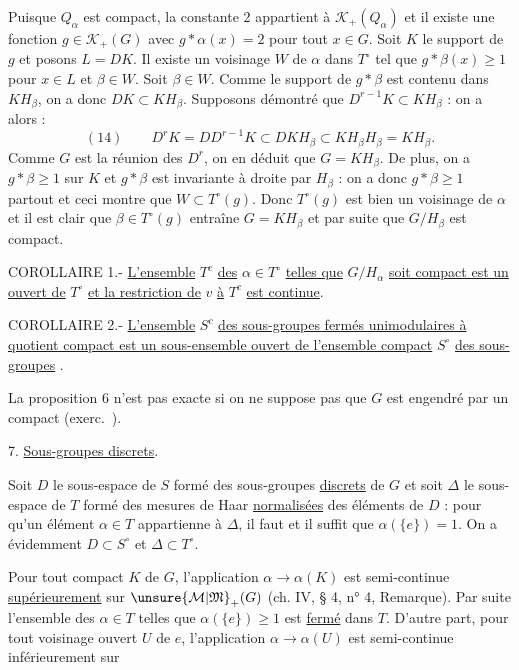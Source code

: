 Puisque $Q_\alpha$ est compact, la constante 2 appartient à $\mathcal K_+(Q_\alpha)$ et il existe une fonction $g\in\mathcal K_+(G)$ avec $g*\alpha(x)=2$ pour tout $x\in G$. Soit $K$ le support de $g$ et posons $L=DK$. Il existe un voisinage $W$ de $\alpha$ dans $T^\circ$ tel que $g*\beta(x)\geq 1$ pour $x\in L$ et $\beta\in W$. Soit $\beta\in W$. Comme le support de $g*\beta$ est contenu dans $KH_\beta$, on a donc $DK\subset KH_\beta$. Supposons démontré que $D^{r-1}K\subset KH_\beta$ : on a alors :
\[
(14)\qquad D^rK=DD^{r-1}K\subset DKH_\beta\subset KH_\beta H_\beta=KH_\beta.
\]
Comme $G$ est la réunion des $D^r$, on en déduit que $G=KH_\beta$. De plus, on a $g*\beta\geq 1$ sur $K$ et $g*\beta$ est invariante à droite par $H_\beta$ : on a donc $g*\beta\geq 1$ partout et ceci montre que $W\subset T^\circ(g)$. Donc $T^\circ(g)$ est bien un voisinage de $\alpha$ et il est clair que $\beta\in T^\circ(g)$ entraîne $G=KH_\beta$ et par suite que $G/H_\beta$ est compact.

COROLLAIRE 1.- \uline{L'ensemble} $T^c$ \uline{des} $\alpha\in T^\circ$ \uline{telles que} $G/H_\alpha$ \uline{soit compact est un ouvert de} $T^\circ$ \uline{et la restriction de} $v$ \uline{à} $T^c$ \uline{est continue}.

COROLLAIRE 2.- \uline{L'ensemble} $S^c$ \uline{des sous-groupes fermés unimodulaires à quotient compact est un sous-ensemble ouvert de l'ensemble compact} $S^\circ$ \uline{des sous-groupes} .

La proposition 6 n'est pas exacte si on ne suppose pas que $G$ est engendré par un compact (exerc.\ ).

7. \uline{Sous-groupes discrets}.

Soit $D$ le sous-espace de $S$ formé des sous-groupes \uline{discrets} de $G$ et soit $\Delta$ le sous-espace de $T$ formé des mesures de Haar \uline{normalisées} des éléments de $D$ : pour qu'un élément $\alpha\in T$ appartienne à $\Delta$, il faut et il suffit que $\alpha(\{e\})=1$. On a évidemment $D\subset S^\circ$ et $\Delta\subset T^\circ$.

Pour tout compact $K$ de $G$, l'application $\alpha\longrightarrow\alpha(K)$ est semi-continue \uline{supérieurement} sur $\unsure{\mathcal M|\mathfrak M}_+(G)$ (ch. IV, § 4, n° 4, Remarque). Par suite l'ensemble des $\alpha\in T$ telles que $\alpha(\{e\})\geq 1$ est \uline{fermé} dans $T$. D'autre part, pour tout voisinage ouvert $U$ de $e$, l'application $\alpha\longrightarrow\alpha(U)$ est semi-continue inférieurement sur
